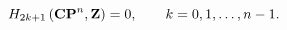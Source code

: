 \begin{equation}
H_{2k+1}\left({\bf CP}^n, {\bf Z}\right)=0, \qquad 
k=0,1,\ldots, n-1.
\label{oncerox}
\end{equation}

